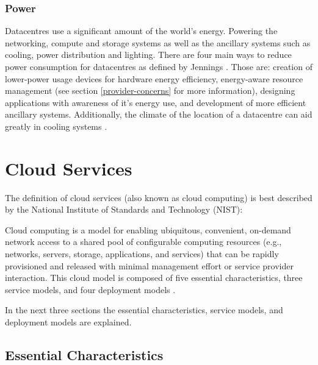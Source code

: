 \documentclass[12pt]{article}
\begin{document}

\subsubsection{Power} \label{ssub:power}

Datacentres use a significant amount of the world's energy. Powering the networking, compute and storage systems as well as the ancillary systems such as cooling, power distribution and lighting.
There are four main ways to reduce power consumption for datacentres as defined by Jennings \cite{Jennings2015}. Those are: creation of lower-power usage devices for hardware energy efficiency, energy-aware resource management (see section \ref{provider-concerns} for more information), designing applications with awareness of it's energy use, and development of more efficient ancillary systems. Additionally, the climate of the location of a datacentre can aid greatly in cooling systems \cite{norwaydatacentre}.


\section{Cloud Services} \label{sec:cloud-services}

The definition of cloud services (also known as cloud computing) is best described by the National Institute of Standards and Technology (NIST):

\begin{displayquote}
Cloud computing is a model for enabling ubiquitous, convenient, on-demand network access to a shared pool of configurable computing resources (e.g., networks, servers, storage, applications, and services) that can be rapidly provisioned and released with minimal management effort or service provider interaction. This cloud model is composed of five essential characteristics, three service models, and four deployment models \cite{mell2011nist}.
\end{displayquote}

In the next three sections the essential characteristics, service models, and deployment models are explained.



\subsection{Essential Characteristics} \label{sub:essential-characteristics}
\end{document}
